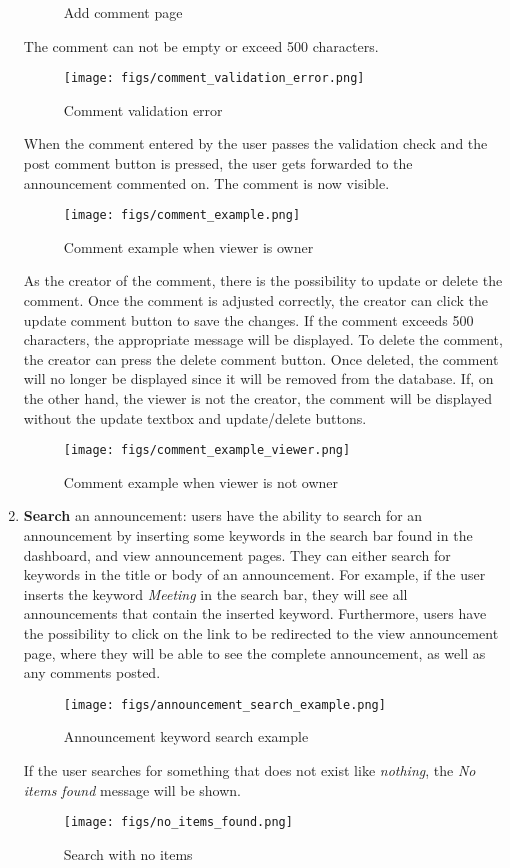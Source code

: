 \documentclass[conference]{IEEEtran}
\begin{document}
\begin{enumerate}
\begin{figure}[H]
    \caption{Add comment page}
    \label{fig:Add comment page}
    \end{figure}
    The comment can not be empty or exceed 500 characters.
    \begin{figure}[H]
    \centering
    \texttt{[image: figs/comment\_validation\_error.png]}
    \caption{Comment validation error}
    \label{fig:Comment validation error}
    \end{figure}
    When the comment entered by the user passes the validation check and the post comment button is pressed, the user gets forwarded to the announcement commented on. The comment is now visible.
    \begin{figure}[H]
    \centering
    \texttt{[image: figs/comment\_example.png]}
    \caption{Comment example when viewer is owner}
    \label{fig:Comment example viewer owner}
    \end{figure}
    As the creator of the comment, there is the possibility to update or delete the comment. Once the comment is adjusted correctly, the creator can click the update comment button to save the changes. If the comment exceeds 500 characters, the appropriate message will be displayed. To delete the comment, the creator can press the delete comment button. Once deleted, the comment will no longer be displayed since it will be removed from the database. If, on the other hand, the viewer is not the creator, the comment will be displayed without the update textbox and update/delete buttons.
    \begin{figure}[H]
    \centering
    \texttt{[image: figs/comment\_example\_viewer.png]}
    \caption{Comment example when viewer is not owner}
    \label{fig:Comment example viewer not owner}
    \end{figure}
    \item \textbf{Search} an announcement: users have the ability to search for an announcement by inserting some keywords in the search bar found in the dashboard, and view announcement pages. They can either search for keywords in the title or body of an announcement. For example, if the user inserts the keyword \textit{Meeting} in the search bar, they will see all announcements that contain the inserted keyword. Furthermore, users have the possibility to click on the link to be redirected to the view announcement page, where they will be able to see the complete announcement, as well as any comments posted.
    \begin{figure}[H]
    \centering
    \texttt{[image: figs/announcement\_search\_example.png]}
    \caption{Announcement keyword search example}
    \label{fig:Announcement keyword search example}
    \end{figure}
    If the user searches for something that does not exist like \textit{nothing}, the \textit{No items found} message will be shown.
    \begin{figure}[H]
    \centering
    \texttt{[image: figs/no\_items\_found.png]}
    \caption{Search with no items}
    \label{fig:Search with no items}
    \end{figure}
\end{enumerate}
\end{document}
